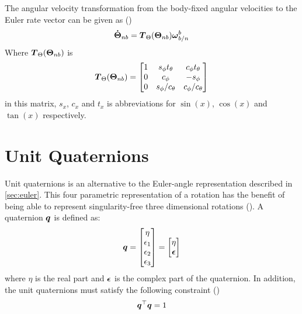 The angular velocity transformation from the body-fixed angular velocities to the Euler rate vector can be given as (\cite{Fossen2011})
\begin{equation}
  \boldsymbol{\dot{\Theta}}_{nb}=\boldsymbol{T}_\Theta(\boldsymbol{\Theta}_{nb})\boldsymbol{\omega}^b_{b/n}
\end{equation}
Where $\boldsymbol{T}_\Theta(\boldsymbol{\Theta}_{nb})$ is
\begin{equation}
\boldsymbol{T}_\Theta(\boldsymbol{\Theta}_{nb})=
  \begin{bmatrix}
    1&s_\phi t_\theta & c_\phi t_\theta\\
    0 & c_\phi & -s_\phi\\
    0 & s_\phi/c_\theta & c_\phi/c_\theta
  \end{bmatrix}
\end{equation}
in this matrix, $s_x$, $c_x$ and $t_x$ is abbreviations for $\sin(x)$, $\cos(x)$ and $\tan(x)$ respectively.

\section{Unit Quaternions}\label{sec:quat}
Unit quaternions is an alternative to the Euler-angle representation described in \ref{sec:euler}. This four parametric representation of a rotation 
has the benefit of being able to represent singularity-free three dimensional rotations (\cite{Fossen2011}). A quaternion $\boldsymbol{q}$ is defined as:
\begin{equation}
  \boldsymbol{q}=
  \begin{bmatrix}
    \eta\\
    \epsilon_1\\
    \epsilon_2\\
    \epsilon_3
  \end{bmatrix}
  =
  \begin{bmatrix}
    \eta\\
    \boldsymbol{\epsilon}
  \end{bmatrix}
\end{equation}
where $\eta$ is the real part and $\boldsymbol{\epsilon}$ is the complex part of the quaternion. In addition, the unit quaternions must satisfy the following constraint (\cite{Fossen2011})
\begin{equation}
  \boldsymbol{q}^\top\boldsymbol{q}=1
\end{equation}


